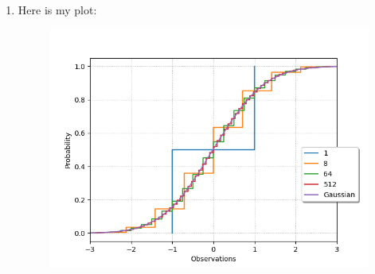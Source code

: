 \documentclass[12pt]{article}
\theoremstyle{definitionstyle}
\begin{document}
\begin{enumerate}[leftmargin=\labelsep]
\begin{enumerate}
			\item Here is my plot:
			\begin{figure}[H]
				\centering
				\includegraphics[scale=0.5]{gaussianplot.png}
			\end{figure}
		\end{enumerate}	
	\end{enumerate}
\end{document}
